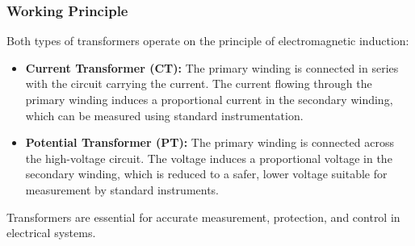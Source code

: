 \documentclass[a4paper,12pt]{article}
\begin{document}
	\subsubsection{Working Principle}
	Both types of transformers operate on the principle of electromagnetic induction:
	\begin{itemize}
		\item \textbf{Current Transformer (CT):} The primary winding is connected in series with the circuit carrying the current. The current flowing through the primary winding induces a proportional current in the secondary winding, which can be measured using standard instrumentation.
		\item \textbf{Potential Transformer (PT):} The primary winding is connected across the high-voltage circuit. The voltage induces a proportional voltage in the secondary winding, which is reduced to a safer, lower voltage suitable for measurement by standard instruments.
	\end{itemize}
	
	Transformers are essential for accurate measurement, protection, and control in electrical systems.
	
\end{document}

